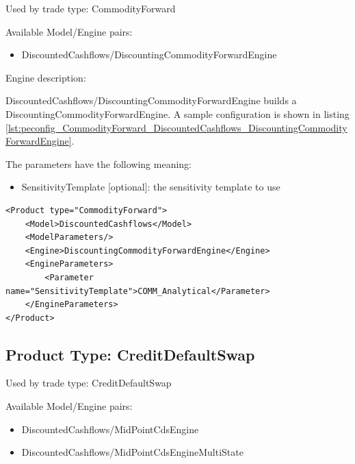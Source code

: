Used by trade type: CommodityForward

Available Model/Engine pairs:

\begin{itemize}
\item DiscountedCashflows/DiscountingCommodityForwardEngine
\end{itemize}

Engine description:

DiscountedCashflows/DiscountingCommodityForwardEngine builds a DiscountingCommodityForwardEngine. A sample configuration is shown in listing
\ref{lst:peconfig_CommodityForward_DiscountedCashflows_DiscountingCommodityForwardEngine}.

The parameters have the following meaning:

\begin{itemize}
\item SensitivityTemplate [optional]: the sensitivity template to use
\end{itemize}

\begin{longlisting}
\begin{verbatim}
<Product type="CommodityForward">
    <Model>DiscountedCashflows</Model>
    <ModelParameters/>
    <Engine>DiscountingCommodityForwardEngine</Engine>
    <EngineParameters>
        <Parameter name="SensitivityTemplate">COMM_Analytical</Parameter>
    </EngineParameters>
</Product>
\end{verbatim}
\caption{Configuration for Product CommodityForward, Model DiscountedCashflows, Engine DiscountingCommodityForwardEngine}
\label{lst:peconfig_CommodityForward_DiscountedCashflows_DiscountingCommodityForwardEngine}
\end{longlisting}

\subsection{Product Type: CreditDefaultSwap}

Used by trade type: CreditDefaultSwap

Available Model/Engine pairs:

\begin{itemize}
\item DiscountedCashflows/MidPointCdsEngine
\item DiscountedCashflows/MidPointCdsEngineMultiState
\end{itemize}

